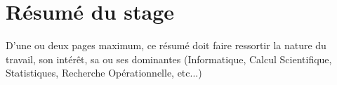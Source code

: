 \section{Résumé du stage}
D'une ou deux pages maximum, ce résumé doit faire ressortir la nature du travail, son intérêt, sa ou ses dominantes (Informatique, Calcul Scientifique, Statistiques, Recherche Opérationnelle, etc...) 
\newpage
